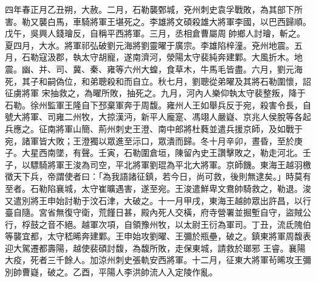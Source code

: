 \begin{pinyinscope}
 四年春正月乙丑朔，大赦。二月，石勒襲鄄城，兗州刺史袁孚戰敗，為其部下所害。勒又襲白馬，車騎將軍王堪死之。李雄將文碩殺雄大將軍李國，以巴西歸順。戊午，吳興人錢璯反，自稱平西將軍。三月，丞相倉曹屬周帥鄉人討璯，斬之。夏四月，大水。將軍祁弘破劉元海將劉靈曜于廣宗。李雄陷梓潼。兗州地震。五月，石勒寇汲郡，執太守胡寵，遂南濟河，滎陽太守裴純奔建鄴。大風折木。地震。幽、并、司、冀、秦、雍等六州大蝗，食草木，牛馬毛皆盡。六月，劉元海死，其子和嗣偽位，和弟聰殺和而自立。秋七月，劉聰從弟曜及其將石勒圍懷，詔征虜將軍
 宋抽救之，為曜所敗，抽死之。九月，河內人樂仰執太守裴整叛，降于石勒。徐州監軍王隆自下邳棄軍奔于周馥。雍州人王如舉兵反于宛，殺害令長，自號大將軍、司雍二州牧，大掠漢沔，新平人龐寔、馮翊人嚴嶷、京兆人侯脫等各起兵應之。征南將軍山簡、荊州刺史王澄、南中郎將杜蕤並遣兵援京師，及如戰于宛，諸軍皆大敗；王澄獨以眾進至沶口，眾潰而歸。冬十月辛卯，晝昏，至於庚子。大星西南墜，有聲。壬寅，石勒圍倉垣，陳留內史王讚擊敗之，勒走河北。壬子，以驃騎將軍王浚為司空，平北將軍劉琨為平北大將軍。京師饑。東海王越羽檄
 徵天下兵，帝謂使者曰：「為我語諸征鎮，若今日，尚可救，後則無逮矣。」時莫有至者。石勒陷襄城，太守崔曠遇害，遂至宛。王浚遣鮮卑文鴦帥騎救之，勒退。浚又遣別將王申始討勒于汶石津，大破之。十一月甲戌，東海王越帥眾出許昌，以行臺自隨。宮省無復守衛，荒饉日甚，殿內死人交橫，府寺營署並掘塹自守，盜賊公行，桴鼓之音不絕。越軍次項，自領豫州牧，以太尉王衍為軍司。丁丑，流氐隗伯等襲宜都，太守嵇晞奔建鄴。王申始攻劉曜、王彌於瓶壘，破之。鎮東將軍周馥表迎大駕遷都壽陽，越使裴碩討馥，為馥所敗，走保東城，請救於瑯邪
 王睿。襄陽大疫，死者三千餘人。加涼州刺史張軌安西將軍。十二月，征東大將軍茍晞攻王彌別帥曹嶷，破之。乙酉，平陽人李洪帥流人入定陵作亂。




\end{pinyinscope}
